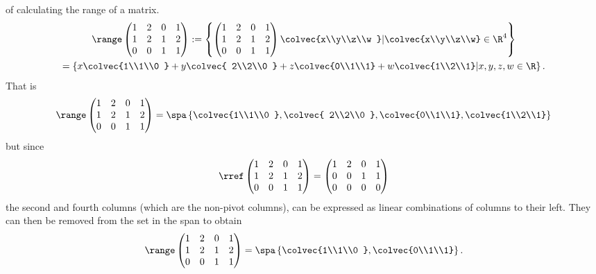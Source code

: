 \begin{example}{ of calculating the range of a matrix.}
\begin{gather*}\range  
\begin{pmatrix} 
1&2&0&1\\
1&2&1&2\\
0&0&1&1
\end{pmatrix} 
:= 
\left\{ 
\begin{pmatrix} 
1&2&0&1\\
1&2&1&2\\
0&0&1&1
\end{pmatrix} 
\colvec{x\\y\\z\\w } | \colvec{x\\y\\z\\w} \in \R^4 \right\}
\\=
\left\{   
x\colvec{1\\1\\0 } +y \colvec{ 2\\2\\0 } +z \colvec{0\\1\\1} + w\colvec{1\\2\\1} \middle| x,y,z,w \in \R \right\}
.\end{gather*}
That is 
\[
\range  
\begin{pmatrix} 
1&2&0&1\\
1&2&1&2\\
0&0&1&1
\end{pmatrix} 
= 
\spa \left\{   
\colvec{1\\1\\0 } , \colvec{ 2\\2\\0 } , \colvec{0\\1\\1}, \colvec{1\\2\\1} \right\}
\]
but since 
\[\rref\begin{pmatrix} 
1&2&0&1\\
1&2&1&2\\
0&0&1&1
\end{pmatrix} 
=\begin{pmatrix} 
1&2&0&1\\
0&0&1&1\\
0&0&0&0
\end{pmatrix} 
\]
the second and fourth columns (which are the non-pivot columns), can be expressed as linear combinations of columns to their left. 
They can then be removed from the set in the span to obtain
\[\range  
\begin{pmatrix} 
1&2&0&1\\
1&2&1&2\\
0&0&1&1
\end{pmatrix} 
= \spa \left\{   
\colvec{1\\1\\0 } , \colvec{0\\1\\1} \right\} .
\]
\end{example}

